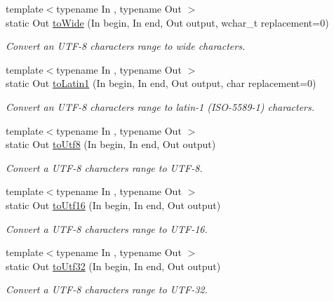 \begin{DoxyCompactItemize}
{\footnotesize template$<$typename In , typename Out $>$ }\\static Out \hyperlink{classsf_1_1_utf_3_018_01_4_ac6633c64ff1fad6bd1bfe72c37b3a468}{to\-Wide} (In begin, In end, Out output, wchar\-\_\-t replacement=0)
\begin{DoxyCompactList}\small\item\em Convert an U\-T\-F-\/8 characters range to wide characters. \end{DoxyCompactList}\item 
{\footnotesize template$<$typename In , typename Out $>$ }\\static Out \hyperlink{classsf_1_1_utf_3_018_01_4_adf6f6e0a8ee0527c8ab390ce5c0b6b13}{to\-Latin1} (In begin, In end, Out output, char replacement=0)
\begin{DoxyCompactList}\small\item\em Convert an U\-T\-F-\/8 characters range to latin-\/1 (I\-S\-O-\/5589-\/1) characters. \end{DoxyCompactList}\item 
{\footnotesize template$<$typename In , typename Out $>$ }\\static Out \hyperlink{classsf_1_1_utf_3_018_01_4_aef68054cab6a592c0b04de94e93bb520}{to\-Utf8} (In begin, In end, Out output)
\begin{DoxyCompactList}\small\item\em Convert a U\-T\-F-\/8 characters range to U\-T\-F-\/8. \end{DoxyCompactList}\item 
{\footnotesize template$<$typename In , typename Out $>$ }\\static Out \hyperlink{classsf_1_1_utf_3_018_01_4_a925ac9e141dcb6f9b07c7b95f7cfbda2}{to\-Utf16} (In begin, In end, Out output)
\begin{DoxyCompactList}\small\item\em Convert a U\-T\-F-\/8 characters range to U\-T\-F-\/16. \end{DoxyCompactList}\item 
{\footnotesize template$<$typename In , typename Out $>$ }\\static Out \hyperlink{classsf_1_1_utf_3_018_01_4_a79395429baba13dd04a8c1fba745ce65}{to\-Utf32} (In begin, In end, Out output)
\begin{DoxyCompactList}\small\item\em Convert a U\-T\-F-\/8 characters range to U\-T\-F-\/32. \end{DoxyCompactList}\item 

\end{DoxyCompactItemize}
